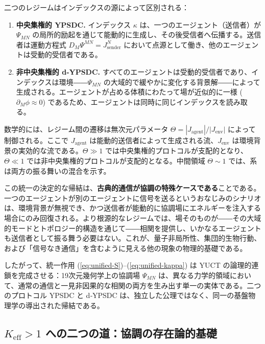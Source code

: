 \documentclass[12pt,a4paper]{article}
\begin{document}
	二つのレジームはインデックスの源によって区別される：
	
	\begin{enumerate}[leftmargin=*, label=\textbf{(\arabic*)}]
		\item \textbf{中央集権的 YPSDC.} インデックス \(\kappa\) は、一つのエージェント（送信者）が \(\Psi_{MN}\) の局所的励起を通じて能動的に生成し、その後受信者へ伝播する。送信者は運動方程式 \(D_M\Psi^{MN} = J^{N}_{\mathrm{sender}}\) において点源として働き、他のエージェントは受動的受信者である。
		\item \textbf{非中央集権的 d‑YPSDC.} すべてのエージェントは受動的受信者であり、インデックスは環境――\(\Psi_{MN}\) の大域的で緩やかに変化する背景解――によって生成される。エージェントが占める体積にわたって場が近似的に一様 (\(\partial_M\phi \approx 0\)) であるため、エージェントは同時に同じインデックスを読み取る。
	\end{enumerate}
	
	数学的には、レジーム間の遷移は無次元パラメータ \(\Theta = |J_{\mathrm{agent}}| / |J_{\mathrm{env}}|\) によって制御される。ここで \(J_{\mathrm{agent}}\) は能動的送信者によって生成される流、\(J_{\mathrm{env}}\) は環境背景の実効的な流である。\(\Theta \gg 1\) では中央集権的プロトコルが支配的となり、\(\Theta \ll 1\) では非中央集権的プロトコルが支配的となる。中間領域 \(\Theta \sim 1\) では、系は両方の振る舞いの混合を示す。
	
	この統一の決定的な帰結は、\textbf{古典的通信が協調の特殊ケースである}ことである。一つのエージェントが別のエージェントに信号を送るというおなじみのシナリオは、環境背景が無視でき、かつ送信者が能動的に協調場にエネルギーを注入する場合にのみ回復される。より根源的なレジームでは、場そのものが――その大域的モードとトポロジー的構造を通じて――相関を提供し、いかなるエージェントも送信者として振る舞う必要はない。これが、量子非局所性、集団的生物行動、および「信号なき通信」を含むように見える他の現象の物理的基礎である。
	
	したがって、統一作用 (\ref{eq:unified-S})–(\ref{eq:unified-kappa}) は YUCT の論理的連鎖を完成させる：19次元幾何学上の協調場 \(\Psi_{MN}\) は、異なる力学的領域において、通常の通信と一見非因果的な相関の両方を生み出す単一の実体である。二つのプロトコル YPSDC と d‑YPSDC は、独立した公理ではなく、同一の基盤物理学の導出された帰結である。
	
	\subsection{\(K_{\mathrm{eff}} > 1\) への二つの道：協調の存在論的基礎}
	\label{subsec:two-paths-ontology}
	
\end{document}
